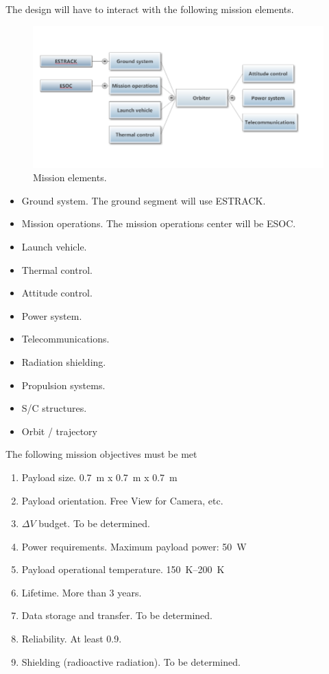 
The design will have to interact with the following mission elements.

\begin{figure}[h]
  \caption{Mission elements.}
  \includegraphics[width=\textwidth]{block-diagram-WP1-1B}
\end{figure}

\begin{itemize}
\item{Ground system.} The ground segment will use ESTRACK.
\item{Mission operations.} The mission operations center will be ESOC.
\item{Launch vehicle.}
\item{Thermal control.}
\item{Attitude control.}
\item{Power system.}
\item{Telecommunications.}
\item{Radiation shielding.}
\item{Propulsion systems.}
\item{S/C structures.}
\item{Orbit / trajectory}
\end{itemize}



The following mission objectives must be met

\begin{enumerate}
\item{Payload size.} \SI{0.7}{m} x \SI{0.7}{m} x \SI{0.7}{m}
\item{Payload orientation.} Free View for Camera, etc.
\item{$\Delta V$ budget.} To be determined.
\item{Power requirements.} Maximum payload power: \SI{50}{W}
\item{Payload operational temperature.} \SI{150}{K}--\SI{200}{K}
\item{Lifetime.} More than 3 years.
\item{Data storage and transfer.} To be determined.
\item{Reliability.} At least 0.9.
\item{Shielding (radioactive radiation).} To be determined.
\end{enumerate}

